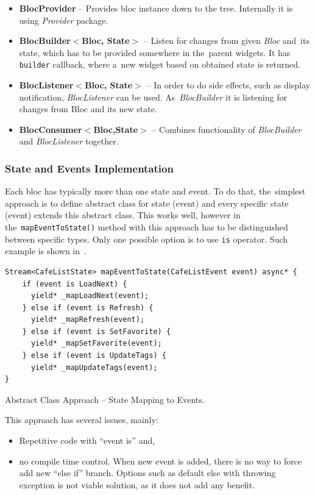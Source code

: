 \begin{itemize}
    \item \textbf{BlocProvider} -- Provides \gls{bloc} instance down to the tree. Internally it is using \textit{Provider} package.
    \item \textbf{BlocBuilder$<$Bloc, State$>$} -- Listen for changes from given \textit{Bloc} and~its state, which has to be provided somewhere in the~parent widgets. It has \verb|builder| callback, where a~new widget based on obtained state is returned. 
    \item \textbf{BlocListener$<$Bloc, State$>$} -- In order to do side effects, such as display notification, \textit{BlocListener} can be used. As~\textit{BlocBuilder} it is listening for changes from Bloc and its new state. 
    \item \textbf{BlocConsumer$<$Bloc,State$>$} -- Combines functionality of \textit{BlocBuilder} and \textit{BlocListener} together.
\end{itemize}

\subsubsection{State and Events Implementation}
Each \gls{bloc} has typically more than one state and event. To do that, the~simplest approach is to define abstract class for state (event) and every specific state (event) extends this abstract class. This works well, however in the~\verb|mapEventToState()| method with this approach has to be distinguished between specific types. Only one possible option is to use \verb|is| operator. Such example is shown in~. 

\begin{listing}[ht]
\begin{verbatim}
Stream<CafeListState> mapEventToState(CafeListEvent event) async* {
    if (event is LoadNext) {
      yield* _mapLoadNext(event);
    } else if (event is Refresh) {
      yield* _mapRefresh(event);
    } else if (event is SetFavorite) {
      yield* _mapSetFavorite(event);
    } else if (event is UpdateTags) {
      yield* _mapUpdateTags(event);
}
\end{verbatim}
\caption{Abstract Class Approach -- State Mapping to Events.}
\label{listing:ct-state-map-abstract}
\end{listing}

This approach has several issues, mainly: 

\begin{itemize}
    \item Repetitive code with ``event is'' and,
    \item no compile time control. When new event is added, there is no way to force add new ``else if'' branch. Options such as default else with throwing exception is not viable solution, as it does not add any benefit.
\end{itemize}

